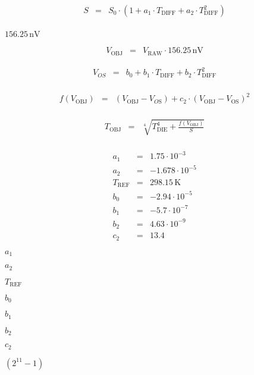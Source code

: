 \documentclass{article}
\begin{document}
\begin{eqnarray*}
         S &=& S_{\mathrm{0}} \cdot ( 1 + a_1 \cdot T_{\mathrm{DIFF}}
               + a_2 \cdot T_{\mathrm{DIFF}}^2 ) \\
     \end{eqnarray*}
\pagebreak

$ 156.25\,\mathrm{nV} $
\pagebreak

\begin{eqnarray*}
         V_{\mathrm{OBJ}} &=& V_{\mathrm{RAW}} \cdot 156.25\,\mathrm{nV}
     \end{eqnarray*}
\pagebreak

\begin{eqnarray*}
         V_{OS} &=& b_0 + b_1 \cdot T_{\mathrm{DIFF}}
                       + b_2 \cdot T_{\mathrm{DIFF}}^2 \\
     \end{eqnarray*}
\pagebreak

\begin{eqnarray*}
         f(V_{\mathrm{OBJ}}) &=& (V_{\mathrm{OBJ}} - V_{O\mathrm{S}})
                                 + c_2 \cdot (V_{\mathrm{OBJ}}
                                 - V_{\mathrm{OS}})^2 \\
     \end{eqnarray*}
\pagebreak

\begin{eqnarray*}
         T_{\mathrm{OBJ}} &=& \sqrt[4]{T_{\mathrm{DIE}}^4
                              + \frac{f(V_{\mathrm{OBJ}})}{S}} \\
     \end{eqnarray*}
\pagebreak

\begin{eqnarray*}
         a_{\mathrm{1}} &=& 1.75 \cdot 10^{-3} \\
         a_{\mathrm{2}} &=& -1.678 \cdot 10^{-5} \\
         T_{\mathrm{REF}} &=& 298.15\,\mathrm{K} \\
         b_{\mathrm{0}} &=& -2.94 \cdot 10^{-5} \\
         b_{\mathrm{1}} &=& -5.7 \cdot 10^{-7} \\
         b_{\mathrm{2}} &=& 4.63 \cdot 10^{-9} \\
         c_{\mathrm{2}} &=& 13.4
     \end{eqnarray*}
\pagebreak

$a_{\mathrm{1}}$
\pagebreak

$a_{\mathrm{2}}$
\pagebreak

$T_{\mathrm{REF}}$
\pagebreak

$b_{\mathrm{0}}$
\pagebreak

$b_{\mathrm{1}}$
\pagebreak

$b_{\mathrm{2}}$
\pagebreak

$c_{\mathrm{2}}$
\pagebreak

$ (2^{11} - 1) $
\pagebreak
\end{document}
